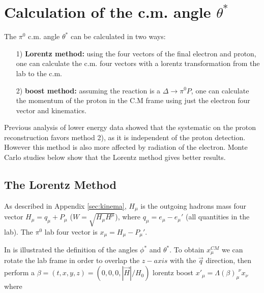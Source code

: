 \section{ Calculation of the c.m. angle $\theta^*$ }\label{sec:cmsyst}

The $\pi^0$ c.m. angle $\theta^*$ can be calculated in two ways:


\begin{itemize}
 \item[1)] {\bf Lorentz method:} using the four vectors of the final electron and proton, 
           one can calculate the c.m. four vectors with a lorentz transformation from the lab to the c.m.
 \item[2)] {\bf boost method:} assuming the reaction is a $\Delta \rightarrow \pi^0 P$, one can calculate
            the momentum of the proton in the C.M frame using just the electron four vector and kinematics.
\end{itemize}

Previous analysis of lower energy data showed that the systematic on the proton reconstruction favors method 2), as it is independent 
of the proton detection. However this method is also more affected by radiation of the electron. Monte Carlo studies
below show that the Lorentz method gives better results. 


\subsection{The Lorentz Method}
As described in Appendix \ref{sec:kinema},  $H_{\mu}$ is the outgoing hadrons mass four vector 
$H_{\mu}=q_{\mu}+P_{\mu}$ ($W=\sqrt{H_\mu H^\mu}$), where 
$q_{\mu}= e_{\mu}-e_{\mu}'$ (all quantities in the lab).
The $\pi^0$ lab four vector is $x_{\mu}=H_{\mu}-P_{\mu}'$.

In  is illustrated the definition of the angles $\phi^*$ and $\theta^*$.
To obtain $x^{CM}_\mu$ we can rotate the lab frame in order to overlap the $z-axis$ with the $\vec{q}$ direction,
then perform a $\beta = (t, x, y, z) = (0, 0, 0, |\vec{H}|/H_0)$ lorentz boost
$x'_\mu = \Lambda(\beta)_\mu^{\,\;\nu} x_\nu$ where


% 

